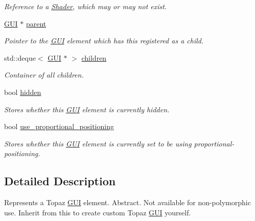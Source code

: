 \begin{DoxyCompactItemize}
\begin{DoxyCompactList}\small\item\em Reference to a \mbox{\hyperlink{class_shader}{Shader}}, which may or may not exist. \end{DoxyCompactList}\item 
\mbox{\label{class_g_u_i_ac9c33263556b3c9997f9c7b360f06a93}} 
\mbox{\hyperlink{class_g_u_i}{G\+UI}} $\ast$ \mbox{\hyperlink{class_g_u_i_ac9c33263556b3c9997f9c7b360f06a93}{parent}}
\begin{DoxyCompactList}\small\item\em Pointer to the \mbox{\hyperlink{class_g_u_i}{G\+UI}} element which has this registered as a child. \end{DoxyCompactList}\item 
\mbox{\label{class_g_u_i_a2ff82067e32c06d5ba9b6aa4d860666a}} 
std\+::deque$<$ \mbox{\hyperlink{class_g_u_i}{G\+UI}} $\ast$ $>$ \mbox{\hyperlink{class_g_u_i_a2ff82067e32c06d5ba9b6aa4d860666a}{children}}
\begin{DoxyCompactList}\small\item\em Container of all children. \end{DoxyCompactList}\item 
\mbox{\label{class_g_u_i_a270e03faf2f4612883700dc89ec7e0d0}} 
bool \mbox{\hyperlink{class_g_u_i_a270e03faf2f4612883700dc89ec7e0d0}{hidden}}
\begin{DoxyCompactList}\small\item\em Stores whether this \mbox{\hyperlink{class_g_u_i}{G\+UI}} element is currently hidden. \end{DoxyCompactList}\item 
\mbox{\label{class_g_u_i_a6b75b1bd88f2e04e919a4a9f2333f634}} 
bool \mbox{\hyperlink{class_g_u_i_a6b75b1bd88f2e04e919a4a9f2333f634}{use\+\_\+proportional\+\_\+positioning}}
\begin{DoxyCompactList}\small\item\em Stores whether this \mbox{\hyperlink{class_g_u_i}{G\+UI}} element is currently set to be using proportional-\/positioning. \end{DoxyCompactList}\end{DoxyCompactItemize}


\subsection{Detailed Description}
Represents a Topaz \mbox{\hyperlink{class_g_u_i}{G\+UI}} element. Abstract. Not available for non-\/polymorphic use. Inherit from this to create custom Topaz \mbox{\hyperlink{class_g_u_i}{G\+UI}} yourself.

